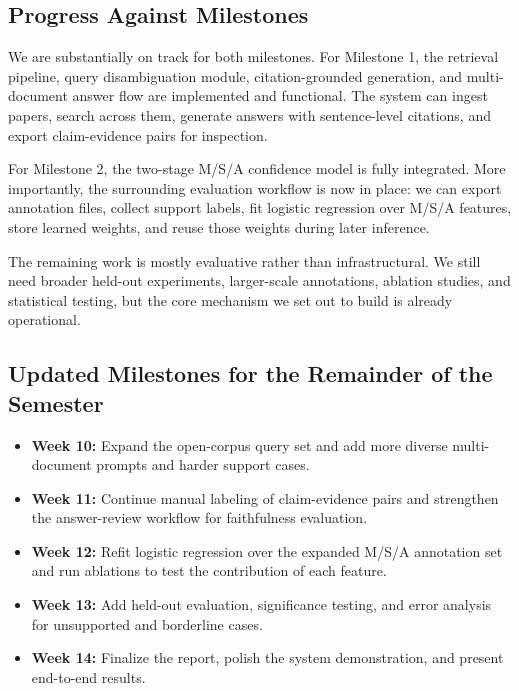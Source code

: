\documentclass[10pt]{article}
\begin{document}
\subsection{Progress Against Milestones}

We are substantially on track for both milestones. For Milestone 1, the
retrieval pipeline, query disambiguation module, citation-grounded
generation, and multi-document answer flow are implemented and
functional. The system can ingest papers, search across them, generate
answers with sentence-level citations, and export claim-evidence pairs
for inspection.

For Milestone 2, the two-stage M/S/A confidence model is fully
integrated. More importantly, the surrounding evaluation workflow is
now in place: we can export annotation files, collect support labels,
fit logistic regression over M/S/A features, store learned weights, and
reuse those weights during later inference.

The remaining work is mostly evaluative rather than infrastructural.
We still need broader held-out experiments, larger-scale annotations,
ablation studies, and statistical testing, but the core mechanism we
set out to build is already operational.

\subsection{Updated Milestones for the Remainder of the Semester}

\begin{itemize}
    \item \textbf{Week 10:} Expand the open-corpus query set and add
    more diverse multi-document prompts and harder support cases.

    \item \textbf{Week 11:} Continue manual labeling of claim-evidence
    pairs and strengthen the answer-review workflow for faithfulness
    evaluation.

    \item \textbf{Week 12:} Refit logistic regression over the expanded
    M/S/A annotation set and run ablations to test the contribution of
    each feature.

    \item \textbf{Week 13:} Add held-out evaluation, significance
    testing, and error analysis for unsupported and borderline cases.

    \item \textbf{Week 14:} Finalize the report, polish the system
    demonstration, and present end-to-end results.
\end{itemize}
\end{document}
